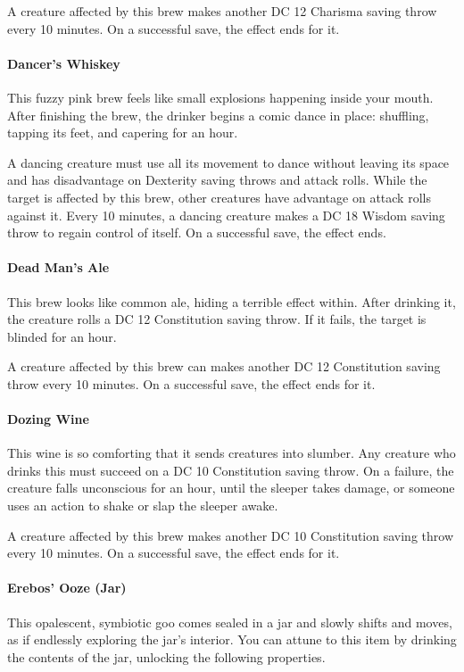     A creature affected by this brew makes another DC 12 Charisma saving throw every 10 minutes.
    On a successful save, the effect ends for it.
\paragraph{Dancer's Whiskey} %
    This fuzzy pink brew feels like small explosions happening inside your mouth.
    After finishing the brew, the drinker begins a comic dance in place: shuffling, tapping its feet, and capering for an hour.

    A dancing creature must use all its movement to dance without leaving its space and has disadvantage on Dexterity saving throws and attack rolls.
    While the target is affected by this brew, other creatures have advantage on attack rolls against it.
    Every 10 minutes, a dancing creature makes a DC 18 Wisdom saving throw to regain control of itself.
    On a successful save, the effect ends.
\paragraph{Dead Man's Ale} %
    This brew looks like common ale, hiding a terrible effect within.
    After drinking it, the creature rolls a DC 12 Constitution saving throw.
    If it fails, the target is blinded for an hour.

    A creature affected by this brew can makes another DC 12 Constitution saving throw every 10 minutes.
    On a successful save, the effect ends for it.
\paragraph{Dozing Wine} %
    This wine is so comforting that it sends creatures into slumber.
    Any creature who drinks this must succeed on a DC 10 Constitution saving throw.
    On a failure, the creature falls unconscious for an hour, until the sleeper takes damage, or someone uses an action to shake or slap the sleeper awake.

    A creature affected by this brew makes another DC 10 Constitution saving throw every 10 minutes.
    On a successful save, the effect ends for it.
\paragraph{Erebos' Ooze (Jar) \odot} \label{item::erebosooze} %
    This opalescent, symbiotic goo comes sealed in a jar and slowly shifts and moves, as if endlessly exploring the jar's interior.
    You can attune to this item by drinking the contents of the jar, unlocking the following properties.


